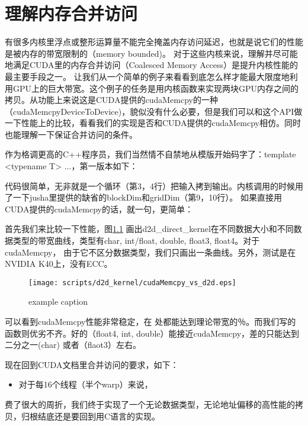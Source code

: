 
\chapter{理解内存合并访问}

有很多内核里浮点或整形运算量不能完全掩盖内存访问延迟，也就是说它们的性能是被内存的带宽限制的（memory bounded)。 对于这些内核来说，理解并尽可能地满足CUDA里的内存合并访问（Coalesced Memory Access）是提升内核性能的最主要手段之一。 让我们从一个简单的例子来看看到底怎么样才能最大限度地利用GPU上的巨大带宽。这个例子的任务是用内核函数来实现两块GPU内存之间的拷贝。从功能上来说这是CUDA提供的cudaMemcpy的一种（cudaMemcpyDeviceToDevice)，貌似没有什么必要，但是我们可以和这个API做一下性能上的比较，看看我们的实现是否和CUDA提供的cudaMemcpy相仿。同时也能理解一下保证合并访问的条件。

作为格调更高的C++程序员，我们当然情不自禁地从模版开始码字了：template <typename T> ...，第一版本如下：
\myvspace

代码很简单，无非就是一个循环（第3，4行）把输入拷到输出。内核调用的时候用了一下jusha里提供的缺省的blockDim和gridDim（第9，10行）。
如果直接用CUDA提供的cudaMemcpy的话，就一句，更简单：
\myvspace


首先我们来比较一下性能，图\ref{fig:d2d_direct} 画出d2d\_direct\_kernel在不同数据大小和不同数据类型的带宽曲线，类型有char, int/float, double, float3, float4。对于cudaMemcpy， 由于它不区分数据类型，我们只画出一条曲线。另外，测试是在NVIDIA K40上，没有ECC。
\begin{figure}[h!] %
   \centering
   \texttt{[image: scripts/d2d\_kernel/cudaMemcpy\_vs\_d2d.eps]} 
   \caption{example caption}
   \label{fig:d2d_direct}
\end{figure}
%

可以看到cudaMemcpy性能非常稳定，在  处都能达到理论带宽的％。而我们写的函数则优劣不齐。好的（float4, int, double）能接近cudaMemcpy，差的只能达到二分之一(char) 或者（flaot3）左右。

现在回到CUDA文档里合并访问的要求，如下：
\begin{itemize}
\item 对于每16个线程（半个warp）来说，
\end{itemize}

费了很大的周折，我们终于实现了一个无论数据类型，无论地址偏移的高性能的拷贝，归根结底还是要回到用C语言的实现。